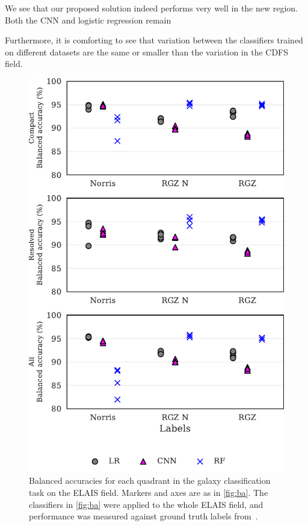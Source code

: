 \documentclass[fleqn,usenatbib,usedcolumn]{mnras}
\begin{document}
We see that our proposed solution indeed performs very well in the new region. Both the CNN and logistic regression remain 

Furthermore, it is comforting
to see that variation between the classifiers trained on different datasets are the same or
smaller than the variation in the CDFS field.

\begin{figure}
\centering
\includegraphics[width=\columnwidth]{images/elais_ba_grid.pdf}
\caption{Balanced accuracies for each quadrant in the galaxy
  classification task on the ELAIS field. Markers and axes are as in \autoref{fig:ba}.
  The classifiers in \autoref{fig:ba}
  were applied to the whole ELAIS field, and performance was measured against
  ground truth labels from~\citet{middelberg08}.
  \label{fig:elais-ba}}
\end{figure}
\end{document}
